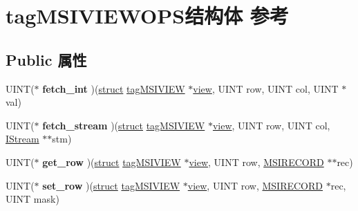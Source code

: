 \hypertarget{structtag_m_s_i_v_i_e_w_o_p_s}{}\section{tag\+M\+S\+I\+V\+I\+E\+W\+O\+P\+S结构体 参考}
\label{structtag_m_s_i_v_i_e_w_o_p_s}
\subsection*{Public 属性}
\begin{DoxyCompactItemize}
\item 
\mbox{\label{structtag_m_s_i_v_i_e_w_o_p_s_a8bcbc5ffdcad557a5b82c1f316bafa86}} 
U\+I\+NT($\ast$ {\bfseries fetch\+\_\+int} )(\hyperlink{interfacestruct}{struct} \hyperlink{structtag_m_s_i_v_i_e_w}{tag\+M\+S\+I\+V\+I\+EW} $\ast$\hyperlink{structview}{view}, U\+I\+NT row, U\+I\+NT col, U\+I\+NT $\ast$val)
\item 
\mbox{\label{structtag_m_s_i_v_i_e_w_o_p_s_aacdd244357ea423e4ac514b2e213e227}} 
U\+I\+NT($\ast$ {\bfseries fetch\+\_\+stream} )(\hyperlink{interfacestruct}{struct} \hyperlink{structtag_m_s_i_v_i_e_w}{tag\+M\+S\+I\+V\+I\+EW} $\ast$\hyperlink{structview}{view}, U\+I\+NT row, U\+I\+NT col, \hyperlink{interface_i_stream}{I\+Stream} $\ast$$\ast$stm)
\item 
\mbox{\label{structtag_m_s_i_v_i_e_w_o_p_s_a69562a2e68f5bb02fdbd4e3b5624c72f}} 
U\+I\+NT($\ast$ {\bfseries get\+\_\+row} )(\hyperlink{interfacestruct}{struct} \hyperlink{structtag_m_s_i_v_i_e_w}{tag\+M\+S\+I\+V\+I\+EW} $\ast$\hyperlink{structview}{view}, U\+I\+NT row, \hyperlink{structtag_m_s_i_r_e_c_o_r_d}{M\+S\+I\+R\+E\+C\+O\+RD} $\ast$$\ast$rec)
\item 
\mbox{\label{structtag_m_s_i_v_i_e_w_o_p_s_a46ff983fb7c20f59fab6bf458fb88f93}} 
U\+I\+NT($\ast$ {\bfseries set\+\_\+row} )(\hyperlink{interfacestruct}{struct} \hyperlink{structtag_m_s_i_v_i_e_w}{tag\+M\+S\+I\+V\+I\+EW} $\ast$\hyperlink{structview}{view}, U\+I\+NT row, \hyperlink{structtag_m_s_i_r_e_c_o_r_d}{M\+S\+I\+R\+E\+C\+O\+RD} $\ast$rec, U\+I\+NT mask)
\item 
\mbox{\label{structtag_m_s_i_v_i_e_w_o_p_s_a296ca071bba0a98e9c20da23dfb003ce}} 

\end{DoxyCompactItemize}
